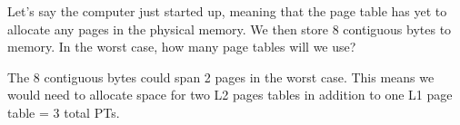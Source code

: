 \begin{blocksection}

Let’s say the computer just started up, meaning that the page table has yet to allocate any pages in the physical memory. We then store 8 contiguous bytes to memory. In the worst case, how many page tables will we use?
\begin{solution}[0.5in]
The 8 contiguous bytes could span 2 pages in the worst case. This means we would need to allocate space for two L2 pages tables in addition to one L1 page table = 3 total PTs.
\end{solution}

\end{blocksection}
